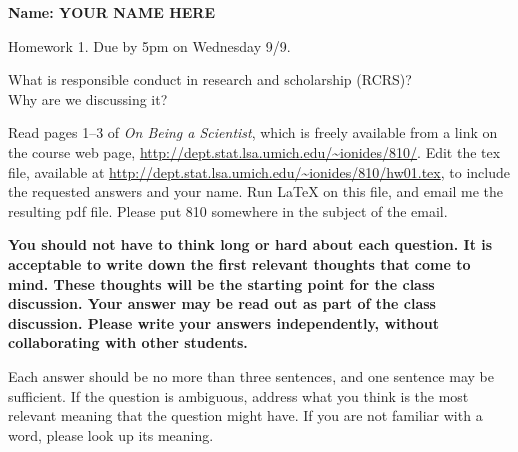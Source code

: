 \documentclass[12pt]{article}
\begin{document}
\begin{center}\bf 
Name: YOUR NAME HERE

Homework 1. Due by 5pm on Wednesday 9/9.

What is responsible conduct in research and scholarship (RCRS)? \\
Why are we discussing it? 
\end{center}

Read pages 1--3 of {\em On Being a Scientist}, which is freely available from a link on the course web page, \url{http://dept.stat.lsa.umich.edu/~ionides/810/}. Edit the tex file, available at \url{http://dept.stat.lsa.umich.edu/~ionides/810/hw01.tex}, to include the requested answers and your name. Run {\LaTeX} on this file, and email me the resulting pdf file. Please put 810 somewhere in the subject of the email.

{\bf You should not have to think long or hard about each question. It is acceptable to write down the first relevant thoughts that come to mind. These thoughts will be the starting point for the class discussion. Your answer may be read out as part of the class discussion. Please write your answers independently, without collaborating with other students.

Each answer should be no more than three sentences, and one sentence may be sufficient. If the question is ambiguous, address what you think is the most relevant meaning that the question might have. If you are not familiar with a word, please look up its meaning.

}
\end{document}
